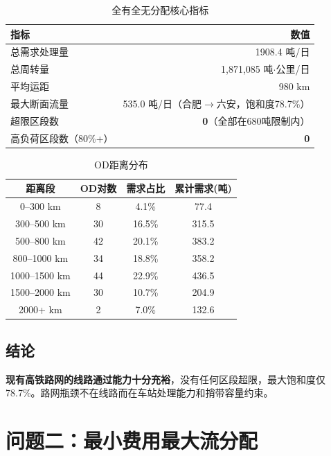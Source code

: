 \documentclass[12pt,a4paper,fontset=none]{ctexart}
\begin{document}
\begin{table}[H]\centering\small
\caption{全有全无分配核心指标}\label{tab:p1}
\begin{tabular}{lr}
\toprule
指标 & 数值 \\
\midrule
总需求处理量 & 1908.4 吨/日 \\
总周转量 & 1,871,085 吨$\cdot$公里/日 \\
平均运距 & 980 km \\
\rowcolor{green!5}
最大断面流量 & 535.0 吨/日（合肥$\to$六安，饱和度78.7\%） \\
超限区段数 & \textbf{0}（全部在680吨限制内） \\
高负荷区段数（80\%+） & \textbf{0} \\
\bottomrule
\end{tabular}
\end{table}

\begin{table}[H]\centering\small
\caption{OD距离分布}\label{tab:dist}
\begin{tabular}{cccc}
\toprule
距离段 & OD对数 & 需求占比 & 累计需求(吨) \\
\midrule
0--300 km & 8 & 4.1\% & 77.4 \\
300--500 km & 30 & 16.5\% & 315.5 \\
500--800 km & 42 & 20.1\% & 383.2 \\
800--1000 km & 34 & 18.8\% & 358.2 \\
1000--1500 km & 44 & 22.9\% & 436.5 \\
1500--2000 km & 30 & 10.7\% & 204.9 \\
2000+ km & 2 & 7.0\% & 132.6 \\
\bottomrule
\end{tabular}
\end{table}

\subsection{结论}
\textbf{现有高铁路网的线路通过能力十分充裕}，没有任何区段超限，最大饱和度仅78.7\%。路网瓶颈不在线路而在车站处理能力和捎带容量约束。

\clearpage

\section{问题二：最小费用最大流分配}
\end{document}
